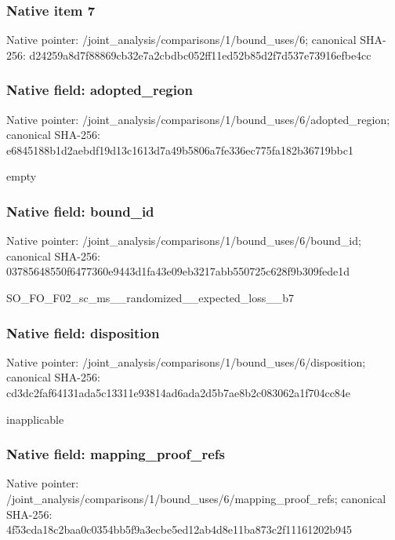 \documentclass[10pt,a4paper]{article}
\begin{document}
\subsubsection{Native item 7}
Native pointer: /joint\_\allowbreak{}analysis/comparisons/1/bound\_\allowbreak{}uses/6; canonical SHA-256: d24259a8d7f88869cb32e7a2cbdbc052ff11ed52b85d2f7d537e73916efbe4cc

\subsubsection{Native field: adopted\_\allowbreak{}region}
Native pointer: /joint\_\allowbreak{}analysis/comparisons/1/bound\_\allowbreak{}uses/6/adopted\_\allowbreak{}region; canonical SHA-256: e6845188b1d2aebdf19d13c1613d7a49b5806a7fe336ec775fa182b36719bbc1

\begingroup\raggedright\sloppy empty\par\endgroup

\subsubsection{Native field: bound\_\allowbreak{}id}
Native pointer: /joint\_\allowbreak{}analysis/comparisons/1/bound\_\allowbreak{}uses/6/bound\_\allowbreak{}id; canonical SHA-256: 03785648550f6477360e9443d1fa43e09eb3217abb550725c628f9b309fede1d

\begingroup\raggedright\sloppy SO\_\allowbreak{}FO\_\allowbreak{}F02\_\allowbreak{}sc\_\allowbreak{}ms\_\allowbreak{}\_\allowbreak{}randomized\_\allowbreak{}\_\allowbreak{}expected\_\allowbreak{}loss\_\allowbreak{}\_\allowbreak{}b7\par\endgroup

\subsubsection{Native field: disposition}
Native pointer: /joint\_\allowbreak{}analysis/comparisons/1/bound\_\allowbreak{}uses/6/disposition; canonical SHA-256: cd3dc2faf64131ada5c13311e93814ad6ada2d5b7ae8b2c083062a1f704cc84e

\begingroup\raggedright\sloppy inapplicable\par\endgroup

\subsubsection{Native field: mapping\_\allowbreak{}proof\_\allowbreak{}refs}
Native pointer: /joint\_\allowbreak{}analysis/comparisons/1/bound\_\allowbreak{}uses/6/mapping\_\allowbreak{}proof\_\allowbreak{}refs; canonical SHA-256: 4f53cda18c2baa0c0354bb5f9a3ecbe5ed12ab4d8e11ba873c2f11161202b945
\end{document}
